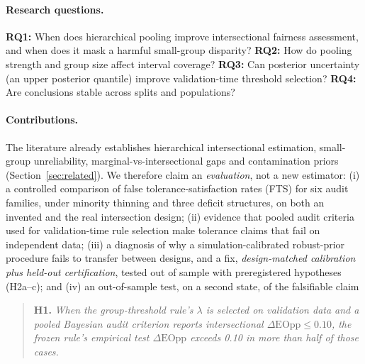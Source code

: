 \documentclass[11pt]{article}
\begin{document}
\paragraph{Research questions.} \textbf{RQ1:} When does hierarchical pooling improve intersectional fairness
assessment, and when does it mask a harmful small-group disparity? \textbf{RQ2:} How do pooling strength and group size
affect interval coverage? \textbf{RQ3:} Can posterior uncertainty (an upper posterior quantile) improve validation-time
threshold selection? \textbf{RQ4:} Are conclusions stable across splits and populations?

\paragraph{Contributions.} The literature already establishes hierarchical intersectional estimation, small-group
unreliability, marginal-vs-intersectional gaps and contamination priors (Section~\ref{sec:related}). We therefore claim
an \emph{evaluation}, not a new estimator:
(i) a controlled comparison of false tolerance-satisfaction rates (FTS) for six audit families, under minority thinning
and three deficit structures, on both an invented and the real intersection design;
(ii) evidence that pooled audit criteria used for validation-time rule selection make tolerance claims that fail on
independent data;
(iii) a diagnosis of why a simulation-calibrated robust-prior procedure fails to transfer between designs, and a fix,
\emph{design-matched calibration plus held-out certification}, tested out of sample with preregistered hypotheses
(H2a--c); and
(iv) an out-of-sample test, on a second state, of the falsifiable claim

\begin{quote}\textbf{H1.} \emph{When the group-threshold rule's $\lambda$ is selected on validation data and a pooled
Bayesian audit criterion reports intersectional $\Delta\text{EOpp}\le0.10$, the frozen rule's empirical test
$\Delta\text{EOpp}$ exceeds 0.10 in more than half of those cases.}\end{quote}
\end{document}
